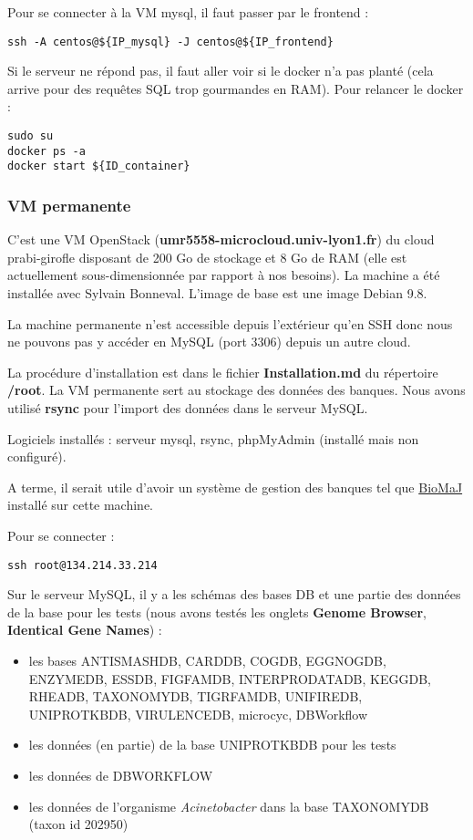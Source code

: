 Pour se connecter à la VM mysql, il faut passer par le frontend :
\begin{lstlisting}[style=bash]
ssh -A centos@${IP_mysql} -J centos@${IP_frontend}
\end{lstlisting}
\bigskip

Si le serveur ne répond pas, il faut aller voir si le docker n'a pas planté (cela arrive pour des requêtes SQL trop gourmandes en RAM).
Pour relancer le docker :
\begin{lstlisting}[style=bash]
sudo su
docker ps -a
docker start ${ID_container}
\end{lstlisting}

\subsubsection {VM permanente}\label{VMpermanente}

C'est une VM OpenStack (\textbf{umr5558-microcloud.univ-lyon1.fr}) du cloud prabi-girofle disposant de 200 Go de stockage et 8 Go de RAM (elle est actuellement sous-dimensionnée par rapport à nos besoins). La machine a été installée avec Sylvain Bonneval. L'image de base est une image Debian 9.8.

La machine permanente n'est accessible depuis l'extérieur qu'en SSH donc nous ne pouvons pas y accéder en MySQL (port 3306) depuis un autre cloud.
\newline

La procédure d'installation est dans le fichier \textbf{Installation.md} du répertoire \textbf{/root}. La VM permanente sert au stockage des données des banques. Nous avons utilisé \textbf{rsync} pour l'import des données dans le serveur MySQL.
\newline

Logiciels installés : serveur mysql, rsync, phpMyAdmin (installé mais non configuré). 
\newline

A terme, il serait utile d'avoir un système de gestion des banques tel que \href{https://biomaj.genouest.org/}{BioMaJ} installé sur cette machine.

Pour se connecter : 
\begin{lstlisting}[style=bash]
ssh root@134.214.33.214
\end{lstlisting}
\bigskip

Sur le serveur MySQL, il y a les schémas des bases DB et une partie des données de la base pour les tests (nous avons testés les onglets \textbf{Genome Browser}, \textbf{Identical Gene Names}) :
\begin{itemize}
	\item les bases ANTISMASHDB, CARDDB, COGDB, EGGNOGDB, ENZYMEDB, ESSDB, FIGFAMDB, INTERPRODATADB, KEGGDB, RHEADB, TAXONOMYDB, TIGRFAMDB, UNIFIREDB, UNIPROTKBDB, VIRULENCEDB, microcyc, DBWorkflow
	\item les données (en partie) de la base UNIPROTKBDB pour les tests
	\item les données de DBWORKFLOW
	\item les données de l'organisme \textit{Acinetobacter} dans la base TAXONOMYDB (taxon id 202950)
\end{itemize}

